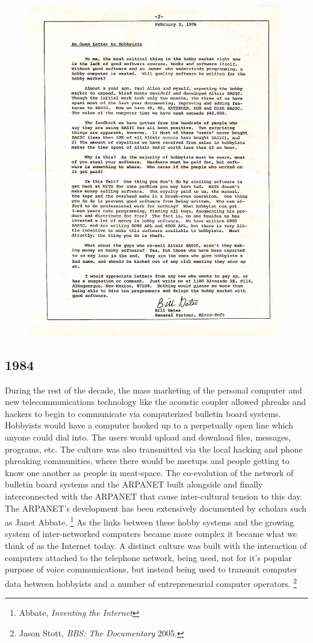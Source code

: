 \documentclass[11pt]{article}
\begin{document}
\begin{figure}
\includegraphics[width=5in]{Bill_Gates_Letter_to_Hobbyists.jpg}
\end{figure}

\subsection{1984}

During the rest of the decade, the mass marketing of the personal computer and new telecommunications technology like the acoustic coupler allowed phreaks and hackers to begin to communicate via computerized bulletin board systems. Hobbyists would have a computer hooked up to a perpetually open line which anyone could dial into. The users would upload and download files, messages, programs, etc. The culture was also transmitted via the local hacking and phone phreaking communities, where there would be meetups and people getting to know one another as people in meat-space.  The co-evolution of the network of bulletin board systems and the ARPANET built alongside and finally interconnected with the ARPANET that cause inter-cultural tension to this day. The ARPANET's development has been extensively documented by scholars such as Janet Abbate.
\footnote{Abbate, \emph{Inventing the Internet}} 
As the links between these hobby systems and the growing system of inter-networked computers became more complex it became what we think of as the Internet today. A distinct culture was built with the interaction of computers attached to the telephone network, being used, not for it’s popular purpose of voice communications, but instead being used to transmit computer data between hobbyists and a number of entrepreneurial computer operators.
\footnote{Jason Stott, \emph{BBS: The Documentary} 2005.}
\end{document}
